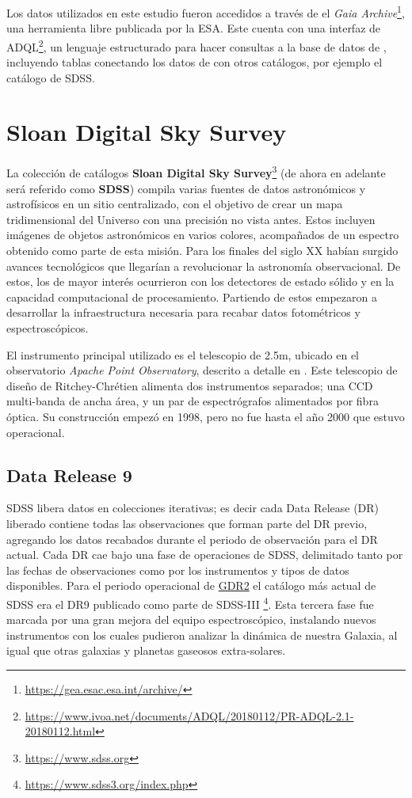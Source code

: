 Los datos utilizados en este estudio fueron accedidos a través de el
\textit{Gaia Archive}\footnote{\url{https://gea.esac.esa.int/archive/}}, una
herramienta libre publicada por la ESA. Este cuenta con una interfaz de
ADQL\footnote{\url{https://www.ivoa.net/documents/ADQL/20180112/PR-ADQL-2.1-20180112.html}},
un lenguaje estructurado para hacer consultas a la base de datos de
\gaiaNoSpace, incluyendo tablas conectando los datos de \gaia con otros
catálogos, por ejemplo el catálogo de SDSS.

\section{Sloan Digital Sky Survey}

La colección de catálogos \textbf{Sloan Digital Sky
Survey}\footnote{\url{https://www.sdss.org}} (de ahora en adelante será referido
como \textbf{SDSS}) compila varias fuentes de datos astronómicos y astrofísicos
en un sitio centralizado, con el objetivo de crear un mapa tridimensional del
Universo con una precisión no vista antes. Estos incluyen imágenes de objetos
astronómicos en varios colores, acompañados de un espectro obtenido como parte
de esta misión. Para los finales del siglo XX habían surgido avances
tecnológicos que llegarían a revolucionar la astronomía observacional. De estos,
los de mayor interés ocurrieron con los detectores de estado sólido y en la
capacidad computacional de procesamiento. Partiendo de estos empezaron a
desarrollar la infraestructura necesaria para recabar datos fotométricos y
espectroscópicos.

El instrumento principal utilizado es el telescopio de 2.5m, ubicado en el
observatorio \textit{Apache Point Observatory}, descrito a detalle en
. Este telescopio de diseño de Ritchey-Chrétien
alimenta dos instrumentos separados; una CCD multi-banda de ancha área, y un par
de espectrógrafos alimentados por fibra óptica. Su construcción empezó en 1998,
pero no fue hasta el año 2000 que estuvo operacional.

\subsection{Data Release 9}

SDSS libera datos en colecciones iterativas; es decir cada Data Release (DR)
liberado contiene todas las observaciones que forman parte del DR previo,
agregando los datos recabados durante el periodo de observación para el DR
actual. Cada DR cae bajo una fase de operaciones de SDSS, delimitado tanto por
las fechas de observaciones como por los instrumentos y tipos de datos
disponibles. Para el periodo operacional de
\hyperref[muestra:sec:gaia:dr2]{GDR2} el catálogo más actual de SDSS era el DR9
publicado como parte de SDSS-III
\footnote{\url{https://www.sdss3.org/index.php}}. Esta tercera fase fue marcada
por una gran mejora del equipo espectroscópico, instalando nuevos instrumentos
con los cuales pudieron analizar la dinámica de nuestra Galaxia, al igual que
otras galaxias y planetas gaseosos extra-solares. 

